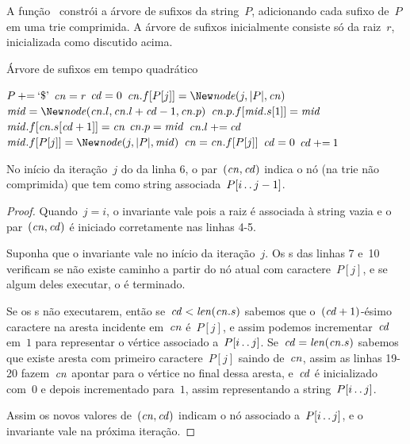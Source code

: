 A função~ constrói a árvore de sufixos da string~$P$, adicionando cada sufixo de~$P$ em uma trie comprimida. A árvore de sufixos inicialmente consiste só da raiz~$r$, inicializada como discutido acima. 

\begin{algorithm}
\caption{Árvore de sufixos em tempo quadrático}
\label{lst:sufftreequad}
\begin{algorithmic}[1]
    \State $P \mathbin{{\tiny +}{=}} \text{`\$'}$
        \State $\mathit{cn} = r$
        \State $\mathit{cd} = 0$
             
                \State $\cn.f[P[j]] = \New \node(j, |P|, \cn)$
                \State \Break
            \EndIf
             
                \State $\mmid = \New \node(\cn.l, \cn.l + \cd - 1, \cn.p)$
                \State $\mathit{cn}.p.f[\mathit{mid}.s[1]] = \mathit{mid}$ 
                \State $\mathit{mid}.f[\mathit{cn}.s[\mathit{cd} + 1]] = \mathit{cn}$
                \State $\mathit{cn}.p = \mathit{mid}$
                \State $\mathit{cn}.l \mathbin{{\tiny +}{=}} \mathit{cd}$
                \State $\mmid.f[P[j]] = \New \node(j, |P|, \mmid)$
                \State \Break
            \EndIf
            \If {$\cd = \len{\cn}$} 
                \State $\mathit{cn} = \mathit{cn}.f[P[j]]$
                \State $\mathit{cd} = 0$
            \EndIf
            \State $\mathit{cd} \mathbin{{\tiny +}{=}} 1$
        \EndFor
    \EndFor
\EndFunction
\end{algorithmic}
\end{algorithm}

\pagebreak
\begin{invar}
No início da iteração~$j$ do  da linha 6, o par~$(\mathit{cn}, \mathit{cd})$ indica o nó (na trie não comprimida) que tem como string associada~$P[i\,.\,.\, j-1]$.
\end{invar}

\begin{proof}
Quando~$j = i$, o invariante vale pois a raiz é associada à string vazia e o par~$(\mathit{cn}, \mathit{cd})$ é iniciado corretamente nas linhas 4-5.

Suponha que o invariante vale no início da iteração~$j$. Os s das linhas 7 e~10 verificam se não existe caminho a partir do nó atual com caractere~$P[j]$, e se algum deles executar, o  é terminado.

Se os s não executarem, então se~$\mathit{cd} < \mathit{len}(\mathit{cn}.s)$ sabemos que o~$(\mathit{cd}+1)$-ésimo caractere na aresta incidente em~$\mathit{cn}$ é~$P[j]$, e assim podemos incrementar~$\mathit{cd}$ em~$1$ para representar o vértice associado a~$P[i\,.\,.\, j]$. Se~$\cd = \len{\cn}$ sabemos que existe aresta com primeiro caractere~$P[j]$ saindo de~$\mathit{cn}$, assim as linhas 19-20 fazem~$\mathit{cn}$ apontar para o vértice no final dessa aresta, e~$\mathit{cd}$ é inicializado com~$0$ e depois incrementado para~$1$, assim representando a string~$P[i\,.\,.\, j]$.

Assim os novos valores de~$(\mathit{cn}, \mathit{cd})$ indicam o nó associado a~$P[i\,.\,.\, j]$, e o invariante vale na próxima iteração.
\end{proof}

